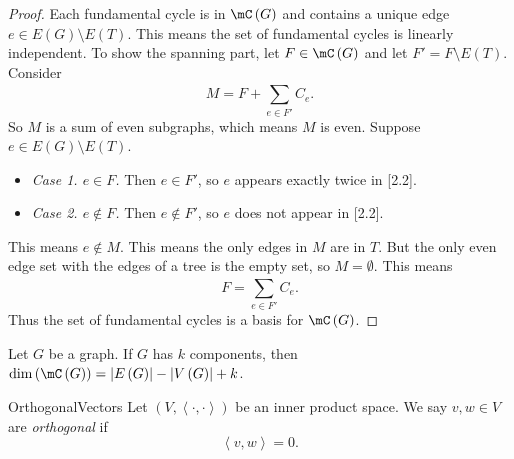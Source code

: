 \documentclass[co342]{subfiles}
\begin{document}
    \begin{proof}
        Each fundamental cycle is in $\mC\left( G \right)$ and contains a unique edge $e\in E\left( G \right)\setminus E\left( T \right)$. This means the set of fundamental cycles is linearly independent. To show the spanning part, let $F\in\mC\left( G \right)$ and let $F'=F\setminus E\left( T \right)$. Consider
        \begin{equation}
            M = F+\sum^{}_{e\in F'}C_e.
        \end{equation}
        So $M$ is a sum of even subgraphs, which means $M$ is even. Suppose $e\in E\left( G \right)\setminus E\left( T \right)$.
        \begin{itemize}
            \item \textit{Case 1. $e\in F$.} Then $e\in F'$, so $e$ appears exactly twice in [2.2].
            \item \textit{Case 2. $e\notin F$.} Then $e\notin F'$, so $e$ does not appear in [2.2].
        \end{itemize} 
        This means $e\notin M$. This means the only edges in $M$ are in $T$. But the only even edge set with the edges of a tree is the empty set, so $M=\emptyset$. This means
        \begin{equation*}
            F = \sum^{}_{e\in F'}C_e.
        \end{equation*}
        Thus the set of fundamental cycles is a basis for $\mC\left( G \right)$.
    \end{proof}

    \begin{cor}{}
        Let $G$ be a graph. If $G$ has $k$ components, then $\dim\left( \mC\left( G \right) \right) = \left| E\left( G \right) \right|-\left| V\left( G \right) \right|+k$.
    \end{cor}	

    \begin{recall}{Orthogonal}{Vectors}
        Let $\left( V,\left\langle \cdot, \cdot\right\rangle \right)$ be an inner product space. We say $v,w\in V$ are \emph{orthogonal} if 
        \begin{equation*}
            \left\langle v, w\right\rangle = 0.
        \end{equation*}
    \end{recall}
\end{document}
